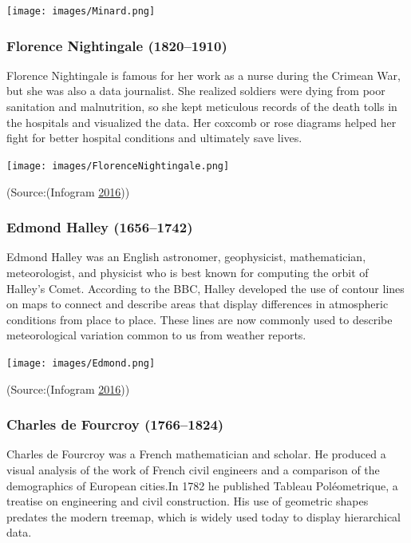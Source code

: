 \documentclass[]{book}
\begin{document}
\texttt{[image: images/Minard.png]}

\hypertarget{florence-nightingale-18201910}{%
\subsubsection{Florence Nightingale (1820--1910)}\label{florence-nightingale-18201910}}

Florence Nightingale is famous for her work as a nurse during the Crimean War, but she was also a data journalist. She realized soldiers were dying from poor sanitation and malnutrition, so she kept meticulous records of the death tolls in the hospitals and visualized the data. Her coxcomb or rose diagrams helped her fight for better hospital conditions and ultimately save lives.

\texttt{[image: images/FlorenceNightingale.png]}

(Source:(Infogram \protect\hyperlink{ref-history_viz}{2016}))

\hypertarget{edmond-halley-16561742}{%
\subsubsection{Edmond Halley (1656--1742)}\label{edmond-halley-16561742}}

Edmond Halley was an English astronomer, geophysicist, mathematician, meteorologist, and physicist who is best known for computing the orbit of Halley's Comet. According to the BBC, Halley developed the use of contour lines on maps to connect and describe areas that display differences in atmospheric conditions from place to place. These lines are now commonly used to describe meteorological variation common to us from weather reports.

\texttt{[image: images/Edmond.png]}

(Source:(Infogram \protect\hyperlink{ref-history_viz}{2016}))

\hypertarget{charles-de-fourcroy-17661824}{%
\subsubsection{Charles de Fourcroy (1766--1824)}\label{charles-de-fourcroy-17661824}}

Charles de Fourcroy was a French mathematician and scholar. He produced a visual analysis of the work of French civil engineers and a comparison of the demographics of European cities.In 1782 he published Tableau Poléometrique, a treatise on engineering and civil construction. His use of geometric shapes predates the modern treemap, which is widely used today to display hierarchical data.
\end{document}
